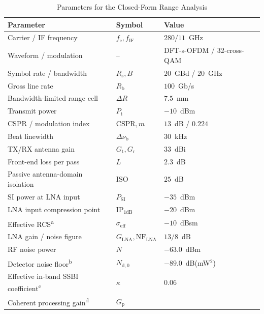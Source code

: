 \documentclass[10pt,journal]{IEEEtran}
\begin{document}
\begin{table}[!t]
\caption{Parameters for the Closed-Form Range Analysis}
\label{tab:simulation_parameters}
\centering
\footnotesize
\renewcommand{\arraystretch}{1.07}
\setlength{\tabcolsep}{2.5pt}
\begin{tabular}{@{}
>{\raggedright\arraybackslash}p{}
>{\centering\arraybackslash}p{}
>{\raggedleft\arraybackslash}p{}
@{}}
\toprule
Parameter & Symbol & Value \\
\midrule
Carrier / IF frequency
    & $f_{\mathrm c},f_{\mathrm{IF}}$
    & $280/11$~GHz \\
Waveform / modulation
    & --
    & DFT-s-OFDM / 32-cross-QAM \\
Symbol rate / bandwidth
    & $R_{\mathrm s},B$
    & $20$~GBd / $20$~GHz \\
Gross line rate
    & $R_{\mathrm b}$
    & $100$~Gb/s \\
Bandwidth-limited range cell
    & $\Delta R$
    & $7.5$~mm \\
Transmit power
    & $P_{\mathrm t}$
    & $-10$~dBm \\
CSPR / modulation index
    & $\mathrm{CSPR},m$
    & $13$~dB / $0.224$ \\
Beat linewidth
    & $\Delta\nu_{\mathrm b}$
    & $30$~kHz \\
TX/RX antenna gain
    & $G_{\mathrm t},G_{\mathrm r}$
    & $33$~dBi \\
Front-end loss per pass
    & $L$
    & $2.3$~dB \\
Passive antenna-domain isolation
    & $\mathrm{ISO}$
    & $25$~dB \\
SI power at LNA input
    & $P_{\mathrm{SI}}$
    & $-35$~dBm \\
LNA input compression point
    & $\mathrm{IP}_{\mathrm{1dB}}$
    & $-20$~dBm \\
Effective RCS\textsuperscript{a}
    & $\sigma_{\mathrm{eff}}$
    & $-10$~dBsm \\
LNA gain / noise figure
    & $G_{\mathrm{LNA}},\mathrm{NF}_{\mathrm{LNA}}$
    & $13/8$~dB \\
RF noise power
    & $N$
    & $-63.0$~dBm \\
Detector noise floor\textsuperscript{b}
    & $N_{\mathrm{d},0}$
    & $-89.0$~dB(mW$^2$)\\
Effective in-band SSBI coefficient\textsuperscript{c}
    & $\kappa$
    & $0.06$ \\
Coherent processing gain\textsuperscript{d}
    & $G_{\mathrm p}$

\end{tabular}
\end{table}
\end{document}
